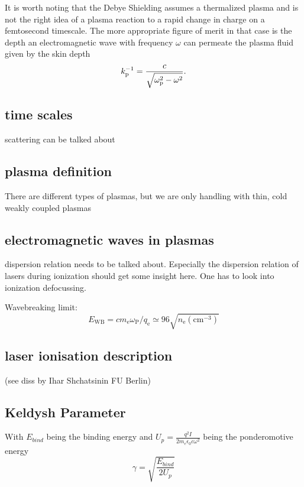 It is worth noting that the Debye Shielding assumes a thermalized plasma and is not the right idea of a plasma reaction to a rapid change in charge on a femtosecond timescale. 
The more appropriate figure of merit in that case is the depth an electromagnetic wave with frequency $\omega$ can permeate the plasma fluid given by the skin depth 
\begin{equation}
k_\mathrm{p}^{-1}=\frac{c}{\sqrt{\omega_\mathrm{p}^2-\omega^2}}.
\end{equation}

\subsection{time scales}
scattering can be talked about

\subsection{plasma definition}
There are different types of plasmas, but we are only handling with thin, cold  weakly coupled plasmas
\subsection{electromagnetic waves in plasmas}
dispersion relation needs to be talked about. Especially the dispersion relation of lasers during ionization should get some insight here. One has to look into ionization defocussing.  

Wavebreaking limit: \begin{equation}
E_\mathrm{WB}=cm_\mathrm{e}\omega_\mathrm{P}/q_\mathrm{e}\simeq 96 \sqrt{n_\mathrm{e}(\mathrm{cm}^{-3})}
\end{equation}

\subsection{laser ionisation description}
(see diss by Ihar Shchatsinin FU Berlin)

\subsection{Keldysh Parameter}

With $E_{bind}$ being the binding energy and $U_p=\frac{q^2 I}{2 m_e \epsilon_0 c \omega^2}$ being the ponderomotive energy 
\begin{equation}
\gamma=\sqrt{\frac{E_{bind}}{2U_p}}
\end{equation}

